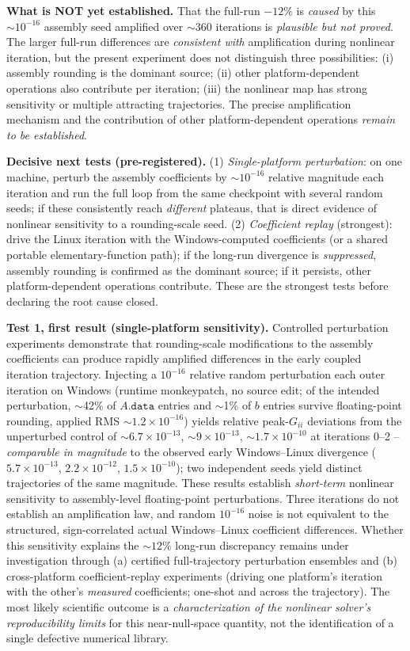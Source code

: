 \documentclass[11pt]{article}
\newcommand{\ten}[1]{\times 10^{#1}}
\begin{document}
\textbf{What is NOT yet established.} That the full-run $-12\%$ is \emph{caused} by this $\sim10^{-16}$ assembly seed amplified over $\sim360$ iterations is \emph{plausible but not proved}. The larger full-run differences are \emph{consistent with} amplification during nonlinear iteration, but the present experiment does not distinguish three possibilities: (i) assembly rounding is the dominant source; (ii) other platform-dependent operations also contribute per iteration; (iii) the nonlinear map has strong sensitivity or multiple attracting trajectories. The precise amplification mechanism and the contribution of other platform-dependent operations \emph{remain to be established}.

\textbf{Decisive next tests (pre-registered).} (1) \emph{Single-platform perturbation}: on one machine, perturb the assembly coefficients by $\sim10^{-16}$ relative magnitude each iteration and run the full loop from the same checkpoint with several random seeds; if these consistently reach \emph{different} plateaus, that is direct evidence of nonlinear sensitivity to a rounding-scale seed. (2) \emph{Coefficient replay} (strongest): drive the Linux iteration with the Windows-computed coefficients (or a shared portable elementary-function path); if the long-run divergence is \emph{suppressed}, assembly rounding is confirmed as the dominant source; if it persists, other platform-dependent operations contribute. These are the strongest tests before declaring the root cause closed.

\textbf{Test 1, first result (single-platform sensitivity).} Controlled perturbation experiments demonstrate that rounding-scale modifications to the assembly coefficients can produce rapidly amplified differences in the early coupled iteration trajectory. Injecting a $10^{-16}$ relative random perturbation each outer iteration on Windows (runtime monkeypatch, no source edit; of the intended perturbation, $\sim$42\% of $A.\mathtt{data}$ entries and $\sim$1\% of $b$ entries survive floating-point rounding, applied RMS $\sim1.2\ten{-16}$) yields relative peak-$G_{ii}$ deviations from the unperturbed control of $\sim6.7\ten{-13}$, $\sim9\ten{-13}$, $\sim1.7\ten{-10}$ at iterations 0--2 -- \emph{comparable in magnitude} to the observed early Windows--Linux divergence ($5.7\ten{-13}$, $2.2\ten{-12}$, $1.5\ten{-10}$); two independent seeds yield distinct trajectories of the same magnitude. These results establish \emph{short-term} nonlinear sensitivity to assembly-level floating-point perturbations. Three iterations do not establish an amplification law, and random $10^{-16}$ noise is not equivalent to the structured, sign-correlated actual Windows--Linux coefficient differences. Whether this sensitivity explains the $\sim12\%$ long-run discrepancy remains under investigation through (a) certified full-trajectory perturbation ensembles and (b) cross-platform coefficient-replay experiments (driving one platform's iteration with the other's \emph{measured} coefficients; one-shot and across the trajectory). The most likely scientific outcome is a \emph{characterization of the nonlinear solver's reproducibility limits} for this near-null-space quantity, not the identification of a single defective numerical library.
\end{document}
